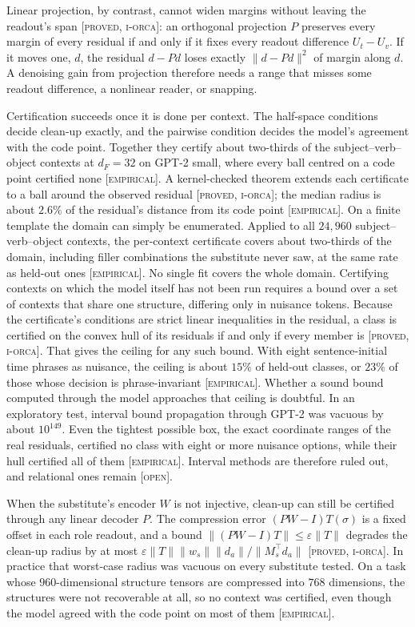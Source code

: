 \documentclass[11pt]{article}
\theoremstyle{definition}
\theoremstyle{plain}
\theoremstyle{remark}
\newcommand{\proved}{\textsc{[proved, i-orca]}}
\newcommand{\empirical}{\textsc{[empirical]}}
\newcommand{\open}{\textsc{[open]}}
\begin{document}
Linear projection, by contrast, cannot widen margins without leaving the readout's span \proved{}: an orthogonal
projection $P$ preserves every margin of every residual if and only if it fixes every readout difference $U_t-U_v$.
If it moves one, $d$, the residual $d-Pd$ loses exactly $\|d-Pd\|^2$ of margin along $d$. A denoising gain from
projection therefore needs a range that misses some readout difference, a nonlinear reader, or snapping.

Certification succeeds once it is done per context. The half-space conditions decide clean-up exactly, and the
pairwise condition decides the model's agreement with the code point. Together they certify about two-thirds of the
subject--verb--object contexts at $d_F=32$ on GPT-2 small, where every ball centred on a code point certified none
\empirical{}. A kernel-checked theorem extends each certificate to a ball around the observed residual
\proved{}; the median radius is about $2.6\%$ of the residual's distance from its code point \empirical{}.
On a finite template the domain can simply be enumerated. Applied to all $24{,}960$ subject--verb--object
contexts, the per-context certificate covers about two-thirds of the domain, including filler combinations the
substitute never saw, at the same rate as held-out ones \empirical{}. No single fit covers the whole domain.
Certifying contexts on which the model itself has not been run requires a bound over a set of contexts that share
one structure, differing only in nuisance tokens. Because the certificate's conditions are strict linear inequalities
in the residual, a class is certified on the convex hull of its residuals if and only if every member is \proved{}.
That gives the ceiling for any such bound. With eight sentence-initial time phrases as nuisance, the ceiling is about
$15\%$ of held-out classes, or $23\%$ of those whose decision is phrase-invariant \empirical{}. Whether a sound bound
computed through the model approaches that ceiling is doubtful. In an exploratory test, interval bound propagation
through GPT-2 was vacuous by about $10^{149}$. Even the tightest possible box, the exact coordinate ranges of the real
residuals, certified no class with eight or more nuisance options, while their hull certified all of them
\empirical{}. Interval methods are therefore ruled out, and relational ones remain \open{}.

When the substitute's encoder $W$ is not injective, clean-up can still be certified through any linear decoder $P$.
The compression error $(PW-I)T(\sigma)$ is a fixed offset in each role readout, and a bound
$\|(PW-I)T\|\le\varepsilon\|T\|$ degrades the clean-up radius by at most $\varepsilon\|T\|\|w_s\|\|d_a\|/\|M_s^{\top}d_a\|$
\proved{}. In practice that worst-case radius was vacuous on every substitute tested. On a task whose $960$-dimensional
structure tensors are compressed into $768$ dimensions, the structures were not recoverable at all, so no context
was certified, even though the model agreed with the code point on most of them \empirical{}.
\end{document}
